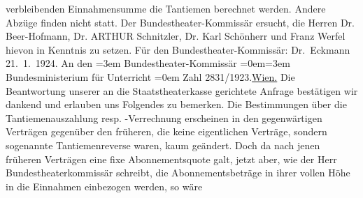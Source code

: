 \begin{ledgroupsized}[t]{13cm}
               verbleibenden Einnahmensumme die Tantiemen berechnet werden. Andere Abzüge finden
               nicht statt.\pend
           \pstart
           Der Bundestheater-Kommissär
               ersucht, die Herren Dr. Beer-Hofmann, Dr. ARTHUR Schnitzler,
               Dr. Karl Schönherr und Franz Werfel hievon in Kenntnis zu setzen.\pend
           \pstart
           Für den Bundestheater-Kommissär: \spacefill\mbox{Dr. Eckmann}\pend
           {\bigskip}\pstart
           \raggedleft{}{\pb}21. 1. 1924.\pend
           \pstart
           An den\pend
           \leftskip=3em{}\pstart
           \noindent{}Bundestheater-Kommissär\pend
           \leftskip=0em{}\leftskip=3em{}\pstart
           Bundesministerium für Unterricht\pend
           \leftskip=0em{}\pstart
           \noindent{}Zahl 2831/1923.\hfill \uline{Wien.}\pend
           \pstart
           Die Beantwortung unserer an die Staatstheaterkasse
               gerichtete Anfrage bestätigen wir dankend und erlauben uns Folgendes zu bemerken.\pend
           \pstart
           Die Bestimmungen über die Tantiemenauszahlung resp. -Verrechnung erscheinen in den
               gegenwärtigen Verträgen gegenüber den früheren, die keine eigentlichen Verträge,
               sondern sogenannte Tantiemenreverse waren, kaum geändert. Doch da nach jenen früheren
               Verträgen eine fixe Abonnementsquote galt, jetzt aber, wie der Herr Bundestheaterkommissär schreibt, die
               Abonnementsbeträge in ihrer vollen Höhe in die Einnahmen einbezogen werden, so wäre

\end{ledgroupsized}
